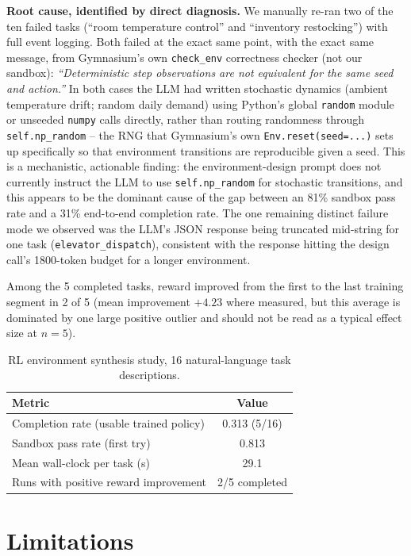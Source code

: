 \documentclass[10pt,twocolumn]{article}
\begin{document}
\textbf{Root cause, identified by direct diagnosis.} We manually re-ran two
of the ten failed tasks (``room temperature control'' and ``inventory
restocking'') with full event logging. Both failed at the exact same
point, with the exact same message, from Gymnasium's own
\texttt{check\_env} correctness checker (not our sandbox):
\emph{``Deterministic step observations are not equivalent for the same
seed and action.''} In both cases the LLM had written stochastic dynamics
(ambient temperature drift; random daily demand) using Python's global
\texttt{random} module or unseeded \texttt{numpy} calls directly, rather
than routing randomness through \texttt{self.np\_random} -- the RNG that
Gymnasium's own \texttt{Env.reset(seed=...)} sets up specifically so that
environment transitions are reproducible given a seed. This is a
mechanistic, actionable finding: the environment-design prompt does not
currently instruct the LLM to use \texttt{self.np\_random} for stochastic
transitions, and this appears to be the dominant cause of the gap between
an 81\% sandbox pass rate and a 31\% end-to-end completion rate. The one
remaining distinct failure mode we observed was the LLM's JSON response
being truncated mid-string for one task (\texttt{elevator\_dispatch}),
consistent with the response hitting the design call's 1800-token budget
for a longer environment.

Among the 5 completed tasks, reward improved from the first to the last
training segment in 2 of 5 (mean improvement $+4.23$ where measured, but
this average is dominated by one large positive outlier and should not be
read as a typical effect size at $n=5$).

\begin{table}[t]
\centering
\caption{RL environment synthesis study, 16 natural-language task descriptions.}
\label{tab:exp4}
\small
\begin{tabular}{lc}
\toprule
Metric & Value \\
\midrule
Completion rate (usable trained policy)  & 0.313 (5/16) \\
Sandbox pass rate (first try)            & 0.813 \\
Mean wall-clock per task (s)             & 29.1 \\
Runs with positive reward improvement    & 2/5 completed \\
\bottomrule
\end{tabular}
\end{table}

\section{Limitations}
\label{sec:limitations}
\end{document}
